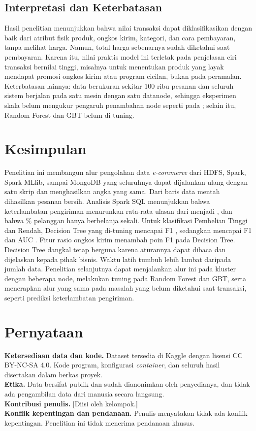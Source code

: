 \documentclass[11pt,a4paper]{article}
\begin{document}
\subsection{Interpretasi dan Keterbatasan}
Hasil penelitian menunjukkan bahwa nilai transaksi dapat diklasifikasikan dengan baik
dari atribut fisik produk, ongkos kirim, kategori, dan cara pembayaran, tanpa melihat
harga. Namun, total harga sebenarnya sudah diketahui saat pembayaran. Karena itu, nilai
praktis model ini terletak pada penjelasan ciri transaksi bernilai tinggi, misalnya
untuk menentukan produk yang layak mendapat promosi ongkos kirim atau program cicilan,
bukan pada peramalan. Keterbatasan lainnya: data berukuran sekitar 100 ribu pesanan dan
seluruh sistem berjalan pada satu mesin dengan satu datanode, sehingga eksperimen skala
belum mengukur pengaruh penambahan node seperti pada \cite{indirman2023,theodorakopoulos2025};
selain itu, Random Forest dan GBT belum di-tuning.

\section{Kesimpulan}
Penelitian ini membangun alur pengolahan data \emph{e-commerce} dari HDFS, Spark,
Spark MLlib, sampai MongoDB yang seluruhnya dapat dijalankan ulang dengan satu skrip
dan menghasilkan angka yang sama. Dari \rawRows{} baris data mentah dihasilkan
\nOrders{} pesanan bersih. Analisis Spark SQL menunjukkan bahwa keterlambatan
pengiriman menurunkan rata-rata ulasan dari \onTimeReview{} menjadi \lateReview, dan
bahwa \oneTimePct\% pelanggan hanya berbelanja sekali. Untuk klasifikasi Pembelian
Tinggi dan Rendah, Decision Tree yang di-tuning mencapai F1 \dtFone, sedangkan
\bestModel{} mencapai F1 \rfFone{} dan AUC \rfAuc. Fitur rasio ongkos kirim menambah
\gainFeatures{} poin F1 pada Decision Tree. Decision Tree dangkal tetap berguna karena
aturannya dapat dibaca dan dijelaskan kepada pihak bisnis. Waktu latih tumbuh lebih
lambat daripada jumlah data. Penelitian selanjutnya dapat menjalankan alur ini pada
kluster dengan beberapa node, melakukan tuning pada Random Forest dan GBT, serta
menerapkan alur yang sama pada masalah yang belum diketahui saat transaksi, seperti
prediksi keterlambatan pengiriman.

\section*{Pernyataan}
\noindent\textbf{Ketersediaan data dan kode.} Dataset tersedia di Kaggle
\cite{olist2018} dengan lisensi CC BY-NC-SA 4.0. Kode program, konfigurasi
\emph{container}, dan seluruh hasil disertakan dalam berkas proyek.\\
\textbf{Etika.} Data bersifat publik dan sudah dianonimkan oleh penyedianya, dan tidak
ada pengambilan data dari manusia secara langsung.\\
\textbf{Kontribusi penulis.} [Diisi oleh kelompok.]\\
\textbf{Konflik kepentingan dan pendanaan.} Penulis menyatakan tidak ada konflik
kepentingan. Penelitian ini tidak menerima pendanaan khusus.
\end{document}
